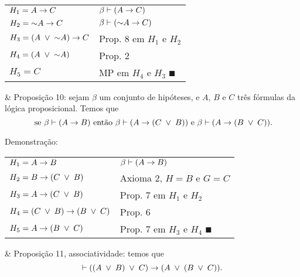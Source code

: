 \begin{tabular}{p{}p{}}
  \hline
    $H_1 = A \rightarrow C$                                           & $ \beta \vdash (A \rightarrow C)$ \\
    $H_2 = \mathord{\sim} A \rightarrow C$                                      & $ \beta \vdash (\mathord{\sim} A \rightarrow C)$ \\
    $H_3 = (A \;\lor\; \mathord{\sim} A) \rightarrow C$                              & Prop. 8 em $H_1$ e $H_2$ \\
    $H_4 = (A \;\lor\; \mathord{\sim} A)$                                     & Prop. 2 \\
    $H_5 = C$                                                  & MP em $H_4$ e $H_3$ $\QED$ \\
  \hline
\end{tabular}

\SKIP

\begin{easylist}

  & Proposição 10: sejam $\beta$ um conjunto de hipóteses, e $A$, $B$ e $C$ três fórmulas da lógica proposicional. Temos que \[ \mbox{ se } \beta \vdash (A \rightarrow B) \mbox{ então } \beta \vdash (A \rightarrow (C \;\lor\; B) ) \mbox{ e } \beta \vdash  (A \rightarrow (B \;\lor\; C) ). \]

\end{easylist}

Demonstração:

\begin{tabular}{p{}p{}}
  \hline
    $H_1 = A \rightarrow B$                                           & $ \beta \vdash (A \rightarrow B)$ \\
    $H_2 = B \rightarrow (C \;\lor\; B)$                                   & Axioma 2, $H = B$ e $G = C$ \\
    $H_3 = A \rightarrow (C \;\lor\; B)$                                   & Prop. 7 em $H_1$ e $H_2$ \\
    $H_4 = (C \;\lor\; B) \rightarrow (B \;\lor\; C)$                           & Prop. 6 \\
    $H_5 = A \rightarrow (B \;\lor\; C)$                                   & Prop. 7 em $H_3$ e $H_4$ $\QED$ \\
  \hline
\end{tabular}

\SKIP

\begin{easylist}

  & Proposição 11, associatividade: temos que \[\vdash ( (A \;\lor\; B) \;\lor\; C ) \rightarrow (A \;\lor\; (B \;\lor\; C) ).\]

\end{easylist}

